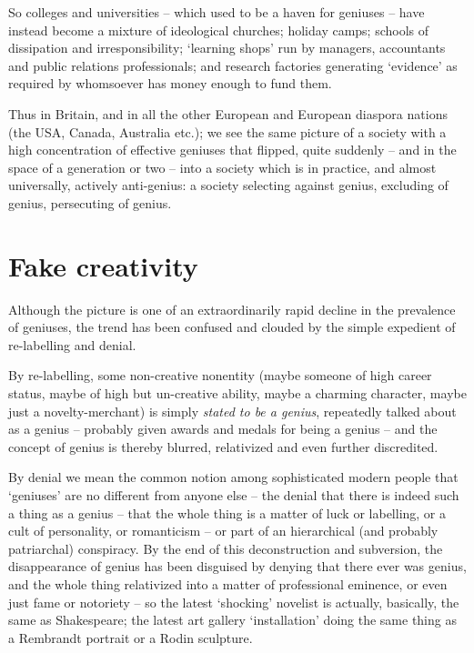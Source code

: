 \documentclass[
]{book}
\begin{document}
So colleges and universities -- which used to be a haven for geniuses -- have instead become a mixture of ideological churches; holiday camps; schools of dissipation and irresponsibility; `learning shops' run by managers, accountants and public relations professionals; and research factories generating `evidence' as required by whomsoever has money enough to fund them.

Thus in Britain, and in all the other European and European diaspora nations (the USA, Canada, Australia etc.); we see the same picture of a society with a high concentration of effective geniuses that flipped, quite suddenly -- and in the space of a generation or two -- into a society which is in practice, and almost universally, actively anti-genius: a society selecting against genius, excluding of genius, persecuting of genius.

\hypertarget{fake-creativity}{%
\section{Fake creativity}\label{fake-creativity}}

Although the picture is one of an extraordinarily rapid decline in the prevalence of geniuses, the trend has been confused and clouded by the simple expedient of re-labelling and denial.

By re-labelling, some non-creative nonentity (maybe someone of high career status, maybe of high but un-creative ability, maybe a charming character, maybe just a novelty-merchant) is simply \emph{stated to be a genius}, repeatedly talked about as a genius -- probably given awards and medals for being a genius -- and the concept of genius is thereby blurred, relativized and even further discredited.

By denial we mean the common notion among sophisticated modern people that `geniuses' are no different from anyone else -- the denial that there is indeed such a thing as a genius -- that the whole thing is a matter of luck or labelling, or a cult of personality, or romanticism -- or part of an hierarchical (and probably patriarchal) conspiracy. By the end of this deconstruction and subversion, the disappearance of genius has been disguised by denying that there ever was genius, and the whole thing relativized into a matter of professional eminence, or even just fame or notoriety -- so the latest `shocking' novelist is actually, basically, the same as Shakespeare; the latest art gallery `installation' doing the same thing as a Rembrandt portrait or a Rodin sculpture.
\end{document}
